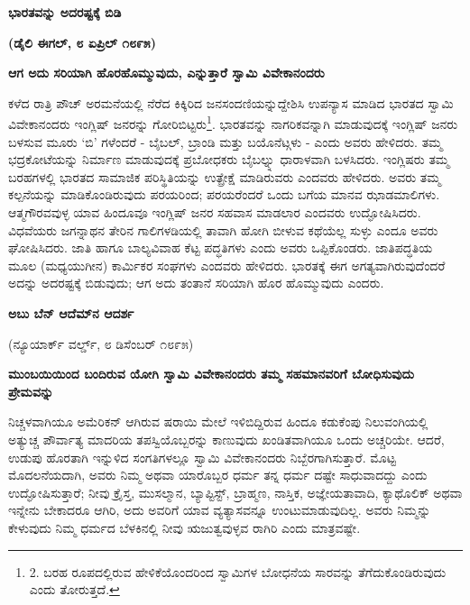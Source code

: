 \begin{center}
\textbf{ಭಾರತವನ್ನು ಅದರಷ್ಟಕ್ಕೆ ಬಿಡಿ}
\end{center}

\begin{center}
\textbf{(ಡೈಲಿ ಈಗಲ್, ೮ ಏಪ್ರಿಲ್ ೧೮೯೫)}
\end{center}

\textbf{ಆಗ ಅದು ಸರಿಯಾಗಿ ಹೊರಹೊಮ್ಮುವುದು, ಎನ್ನುತ್ತಾರೆ ಸ್ವಾಮಿ ವಿವೇಕಾನಂದರು}

ಕಳೆದ ರಾತ್ರಿ ಪೌಚ್ ಅರಮನೆಯಲ್ಲಿ ನೆರೆದ ಕಿಕ್ಕಿರಿದ ಜನಸಂದಣಿಯನ್ನುದ್ದೇಶಿಸಿ ಉಪನ್ಯಾಸ ಮಾಡಿದ ಭಾರತದ ಸ್ವಾಮಿ ವಿವೇಕಾನಂದರು ಇಂಗ್ಲಿಷ್ ಜನರನ್ನು ಗೋರಿಬಿಟ್ಟರು\footnote{2. ಬರಹ ರೂಪದಲ್ಲಿರುವ ಹೇಳಿಕೆಯೊಂದರಿಂದ ಸ್ವಾಮಿಗಳ ಬೋಧನೆಯ ಸಾರವನ್ನು ತೆಗೆದುಕೊಂಡಿರುವುದು ಎಂದು ತೋರುತ್ತದೆ.}. ಭಾರತವನ್ನು ನಾಗರಿಕವನ್ನಾಗಿ ಮಾಡುವುದಕ್ಕೆ ಇಂಗ್ಲಿಷ್ ಜನರು ಬಳಸುವ ಮೂರು ‘ಬಿ’ ಗಳೆಂದರೆ - ಬೈಬಲ್, ಬ್ರಾಂಡಿ ಮತ್ತು ಬಯೊನೆಟ್ಗಳು - ಎಂದು ಅವರು ಹೇಳಿದರು. ತಮ್ಮ ಭದ್ರಕೋಟೆಯನ್ನು ನಿರ್ಮಾಣ ಮಾಡುವುದಕ್ಕೆ ಪ್ರಬೋಧಕರು ಬೈಬಲ್ನ್ನು ಧಾರಾಳವಾಗಿ ಬಳಸಿದರು. ಇಂಗ್ಲಿಷರು ತಮ್ಮ ಬರಹಗಳಲ್ಲಿ ಭಾರತದ ಸಾಮಾಜಿಕ ಪರಿಸ್ಥಿತಿಯನ್ನು ಉತ್ಪ್ರೇಕ್ಷೆ ಮಾಡಿರುವರು ಎಂದವರು ಹೇಳಿದರು. ಅವರು ತಮ್ಮ ಕಲ್ಪನೆಯನ್ನು ಮಾಡಿಕೊಂಡಿರುವುದು ಪರಯರಿಂದ; ಪರಯರೆಂದರೆ ಒಂದು ಬಗೆಯ ಮಾನವ ಝಾಡಮಾಲಿಗಳು. ಆತ್ಮಗೌರವವುಳ್ಳ ಯಾವ ಹಿಂದೂವೂ ಇಂಗ್ಲಿಷ್ ಜನರ ಸಹವಾಸ ಮಾಡಲಾರ ಎಂದವರು ಉದ್ಘೋಷಿಸಿದರು. ವಿಧವೆಯರು ಜಗನ್ನಾಥನ ತೇರಿನ ಗಾಲಿಗಳಡಿಯಲ್ಲಿ ತಾವಾಗಿ ಹೋಗಿ ಬೀಳುವ ಕಥೆಯೆಲ್ಲ ಸುಳ್ಳು ಎಂದೂ ಅವರು ಘೋಷಿಸಿದರು. ಜಾತಿ ಹಾಗೂ ಬಾಲ್ಯವಿವಾಹ ಕೆಟ್ಟ ಪದ್ಧತಿಗಳು ಎಂದು ಅವರು ಒಪ್ಪಿಕೊಂಡರು. ಜಾತಿಪದ್ಧತಿಯ ಮೂಲ (ಮಧ್ಯಯುಗೀನ) ಕಾರ್ಮಿಕರ ಸಂಘಗಳು ಎಂದವರು ಹೇಳಿದರು. ಭಾರತಕ್ಕೆ ಈಗ ಅಗತ್ಯವಾಗಿರುವುದೆಂದರೆ ಅದನ್ನು ಅದರಷ್ಟಕ್ಕೆ ಬಿಡುವುದು; ಆಗ ಅದು ತಂತಾನೆ ಸರಿಯಾಗಿ ಹೊರ ಹೊಮ್ಮುವುದು ಎಂದರು.

\textbf{ಅಬು ಬೆನ್ ಆದೆಮ್​ನ ಆದರ್ಶ}

\begin{center}
(ನ್ಯೂಯಾರ್ಕ್ ವರ್ಲ್ಡ್, ೮ ಡಿಸೆಂಬರ್ ೧೮೯೫)
\end{center}

\textbf{ಮುಂಬಯಿಯಿಂದ ಬಂದಿರುವ ಯೋಗಿ ಸ್ವಾಮಿ ವಿವೇಕಾನಂದರು ತಮ್ಮ ಸಹಮಾನವರಿಗೆ ಬೋಧಿಸುವುದು ಪ್ರೇಮವನ್ನು}

ನಿಚ್ಚಳವಾಗಿಯೂ ಅಮೆರಿಕನ್ ಆಗಿರುವ ಷರಾಯಿ ಮೇಲೆ ಇಳಿಬಿದ್ದಿರುವ ಹಿಂದೂ ಕಡುಕೆಂಪು ನಿಲುವಂಗಿಯಲ್ಲಿ ಅತ್ಯುಚ್ಚ ಪೌರ್ವಾತ್ಯ ಮಾದರಿಯ ತಪಸ್ವಿಯೊಬ್ಬರನ್ನು ಕಾಣುವುದು ಖಂಡಿತವಾಗಿಯೂ ಒಂದು ಅಚ್ಚರಿಯೇ. ಆದರೆ, ಉಡುಪು ಹೊರತಾಗಿ ಇನ್ನುಳಿದ ಸಂಗತಿಗಳಲ್ಲೂ ಸ್ವಾಮಿ ವಿವೇಕಾನಂದರು ನಿಬ್ಬೆರಗಾಗಿಸುತ್ತಾರೆ. ಮೊಟ್ಟ ಮೊದಲನೆಯದಾಗಿ, ಅವರು ನಿಮ್ಮ ಅಥವಾ ಯಾರೊಬ್ಬರ ಧರ್ಮ ತನ್ನ ಧರ್ಮ ದಷ್ಟೇ ಸಾಧುವಾದದ್ದು ಎಂದು ಉದ್ಘೋಷಿಸುತ್ತಾರೆ; ನೀವು ಕ್ರೈಸ್ತ, ಮುಸಲ್ಮಾನ, ಬ್ಯಾಪ್ಟಿಸ್ಟ್, ಬ್ರಾಹ್ಮಣ, ನಾಸ್ತಿಕ, ಅಜ್ಞೇಯತಾವಾದಿ, ಕ್ಯಾಥೊಲಿಕ್ ಅಥವಾ ಇನ್ನೇನು ಬೇಕಾದರೂ ಆಗಿರಿ, ಅದು ಅವರಿಗೆ ಯಾವ ವ್ಯತ್ಯಾಸವನ್ನೂ ಉಂಟುಮಾಡುವುದಿಲ್ಲ. ಅವರು ನಿಮ್ಮನ್ನು ಕೇಳುವುದು ನಿಮ್ಮ ಧರ್ಮದ ಬೆಳಕಿನಲ್ಲಿ ನೀವು ಋಜುತ್ವವುಳ್ಳವ ರಾಗಿರಿ ಎಂದು ಮಾತ್ರವಷ್ಟೇ.

